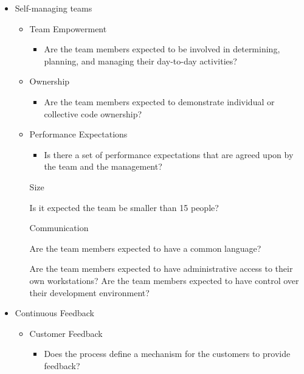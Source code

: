 \begin{appendices}
\begin{itemize}
\begin{itemize}
\begin{itemize}
				\end{itemize}
		\end{itemize}
	\item Self-managing teams
		\begin{itemize}
			\item Team Empowerment
				\begin{itemize}
					\item Are the team members expected to be involved in determining, planning, and managing their day-to-day activities?
				\end{itemize}
			\item Ownership
				\begin{itemize}
					\item Are the team members expected to demonstrate individual or collective code ownership? 
				\end{itemize}
			\item Performance Expectations
				\begin{itemize}
					\item Is there a set of performance expectations that are agreed upon by the team and the management?
				\end{itemize}
			\addition Size
				\begin{itemize}
					\addition Is it expected the team be smaller than 15 people?
				\end{itemize}
			\addition Communication
				\begin{itemize}
					\addition Are the team members expected to have a common language?
				\end{itemize}
			\addition{System Administration}
				\begin{itemize}
					\addition Are the team members expected to have administrative access to their own workstations?
					\addition Are the team members expected to have control over their development environment?	
				\end{itemize}
		\end{itemize}
	\item Continuous Feedback
		\begin{itemize}
			\item Customer Feedback
				\begin{itemize}
					\item Does the process define a mechanism for the customers to provide feedback?

\end{itemize}
\end{itemize}
\end{itemize}
\end{appendices}
